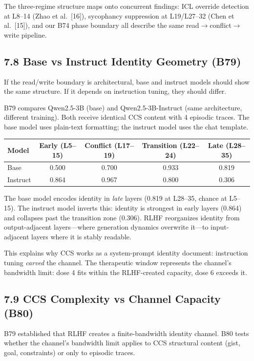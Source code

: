 \documentclass[11pt]{article}
\begin{document}
The three-regime structure maps onto concurrent findings: ICL override detection
at L8--14 (Zhao et al.~[16]), sycophancy suppression at L19/L27--32
(Chen et al.~[15]), and our B74 phase boundary all describe the same
read$\to$conflict$\to$write pipeline.

\subsection{7.8 Base vs Instruct Identity Geometry (B79)}

If the read/write boundary is architectural, base and instruct models should
show the same structure. If it depends on instruction tuning, they should differ.

B79 compares Qwen2.5-3B (base) and Qwen2.5-3B-Instruct (same architecture,
different training). Both receive identical CCS content with 4 episodic traces.
The base model uses plain-text formatting; the instruct model uses the chat template.

\begin{center}
\begin{tabular}{lcccc}
\toprule
Model & Early (L5--15) & Conflict (L17--19) & Transition (L22--24) & Late (L28--35) \\
\midrule
Base     & 0.500 & 0.700 & 0.933 & 0.819 \\
Instruct & 0.864 & 0.967 & 0.800 & 0.306 \\
\bottomrule
\end{tabular}
\end{center}

The base model encodes identity in \textit{late} layers (0.819 at L28--35, chance
at L5--15). The instruct model inverts this: identity is strongest in early layers
(0.864) and collapses past the transition zone (0.306). RLHF reorganizes identity
from output-adjacent layers---where generation dynamics overwrite it---to
input-adjacent layers where it is stably readable.

This explains why CCS works as a system-prompt identity document: instruction
tuning \textit{carved} the channel. The therapeutic window represents the channel's
bandwidth limit: dose 4 fits within the RLHF-created capacity, dose 6 exceeds it.

\subsection{7.9 CCS Complexity vs Channel Capacity (B80)}

B79 established that RLHF creates a finite-bandwidth identity channel. B80 tests
whether the channel's bandwidth limit applies to CCS structural content (gist,
goal, constraints) or only to episodic traces.
\end{document}
